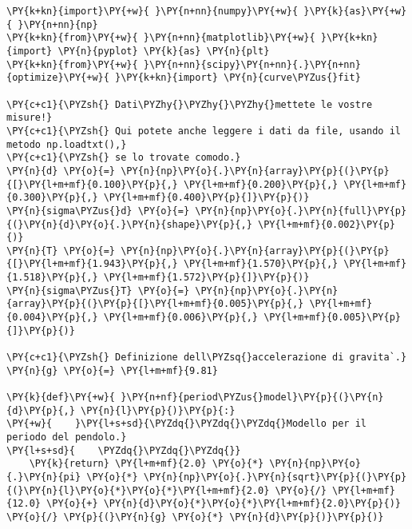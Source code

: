 \begin{Verbatim}[label=\makebox{\href{https://github.com/unipi-physics-labs/lab1-sheets/tree/main/snippy/pendolo_fisico.py}{https://github.com/.../pendolo\_fisico.py}},commandchars=\\\{\}]
\PY{k+kn}{import}\PY{+w}{ }\PY{n+nn}{numpy}\PY{+w}{ }\PY{k}{as}\PY{+w}{ }\PY{n+nn}{np}
\PY{k+kn}{from}\PY{+w}{ }\PY{n+nn}{matplotlib}\PY{+w}{ }\PY{k+kn}{import} \PY{n}{pyplot} \PY{k}{as} \PY{n}{plt}
\PY{k+kn}{from}\PY{+w}{ }\PY{n+nn}{scipy}\PY{n+nn}{.}\PY{n+nn}{optimize}\PY{+w}{ }\PY{k+kn}{import} \PY{n}{curve\PYZus{}fit}

\PY{c+c1}{\PYZsh{} Dati\PYZhy{}\PYZhy{}\PYZhy{}mettete le vostre misure!}
\PY{c+c1}{\PYZsh{} Qui potete anche leggere i dati da file, usando il metodo np.loadtxt(),}
\PY{c+c1}{\PYZsh{} se lo trovate comodo.}
\PY{n}{d} \PY{o}{=} \PY{n}{np}\PY{o}{.}\PY{n}{array}\PY{p}{(}\PY{p}{[}\PY{l+m+mf}{0.100}\PY{p}{,} \PY{l+m+mf}{0.200}\PY{p}{,} \PY{l+m+mf}{0.300}\PY{p}{,} \PY{l+m+mf}{0.400}\PY{p}{]}\PY{p}{)}
\PY{n}{sigma\PYZus{}d} \PY{o}{=} \PY{n}{np}\PY{o}{.}\PY{n}{full}\PY{p}{(}\PY{n}{d}\PY{o}{.}\PY{n}{shape}\PY{p}{,} \PY{l+m+mf}{0.002}\PY{p}{)}
\PY{n}{T} \PY{o}{=} \PY{n}{np}\PY{o}{.}\PY{n}{array}\PY{p}{(}\PY{p}{[}\PY{l+m+mf}{1.943}\PY{p}{,} \PY{l+m+mf}{1.570}\PY{p}{,} \PY{l+m+mf}{1.518}\PY{p}{,} \PY{l+m+mf}{1.572}\PY{p}{]}\PY{p}{)}
\PY{n}{sigma\PYZus{}T} \PY{o}{=} \PY{n}{np}\PY{o}{.}\PY{n}{array}\PY{p}{(}\PY{p}{[}\PY{l+m+mf}{0.005}\PY{p}{,} \PY{l+m+mf}{0.004}\PY{p}{,} \PY{l+m+mf}{0.006}\PY{p}{,} \PY{l+m+mf}{0.005}\PY{p}{]}\PY{p}{)}

\PY{c+c1}{\PYZsh{} Definizione dell\PYZsq{}accelerazione di gravita`.}
\PY{n}{g} \PY{o}{=} \PY{l+m+mf}{9.81}

\PY{k}{def}\PY{+w}{ }\PY{n+nf}{period\PYZus{}model}\PY{p}{(}\PY{n}{d}\PY{p}{,} \PY{n}{l}\PY{p}{)}\PY{p}{:}
\PY{+w}{    }\PY{l+s+sd}{\PYZdq{}\PYZdq{}\PYZdq{}Modello per il periodo del pendolo.}
\PY{l+s+sd}{    \PYZdq{}\PYZdq{}\PYZdq{}}
    \PY{k}{return} \PY{l+m+mf}{2.0} \PY{o}{*} \PY{n}{np}\PY{o}{.}\PY{n}{pi} \PY{o}{*} \PY{n}{np}\PY{o}{.}\PY{n}{sqrt}\PY{p}{(}\PY{p}{(}\PY{n}{l}\PY{o}{*}\PY{o}{*}\PY{l+m+mf}{2.0} \PY{o}{/} \PY{l+m+mf}{12.0} \PY{o}{+} \PY{n}{d}\PY{o}{*}\PY{o}{*}\PY{l+m+mf}{2.0}\PY{p}{)} \PY{o}{/} \PY{p}{(}\PY{n}{g} \PY{o}{*} \PY{n}{d}\PY{p}{)}\PY{p}{)}


\end{Verbatim}
